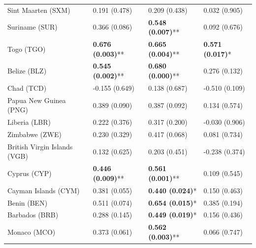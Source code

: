 \begin{longtable}{p{5cm}p{3cm}p{3cm}p{5cm}}
Sint Maarten (SXM) & \textcolor{atlOrange600}{0.191 (0.478)} & \textcolor{atlOrange600}{0.209 (0.438)} & \textcolor{atlOrange600}{0.032 (0.905)} \\
Suriname (SUR) & \textcolor{atlOrange600}{0.366 (0.086)} & \textcolor{atlLime600}{\textbf{0.548 (0.007)}**} & \textcolor{atlOrange600}{0.092 (0.676)} \\
Togo (TGO) & \textcolor{atlLime600}{\textbf{0.676 (0.003)}**} & \textcolor{atlLime600}{\textbf{0.665 (0.004)}**} & \textcolor{atlLime600}{\textbf{0.571 (0.017)}*} \\
Belize (BLZ) & \textcolor{atlLime600}{\textbf{0.545 (0.002)}**} & \textcolor{atlLime600}{\textbf{0.680 (0.000)}**} & \textcolor{atlOrange600}{0.276 (0.132)} \\
Chad (TCD) & \textcolor{atlOrange600}{-0.155 (0.649)} & \textcolor{atlOrange600}{0.138 (0.687)} & \textcolor{atlOrange600}{-0.510 (0.109)} \\
Papua New Guinea (PNG) & \textcolor{atlOrange600}{0.389 (0.090)} & \textcolor{atlOrange600}{0.387 (0.092)} & \textcolor{atlOrange600}{0.134 (0.574)} \\
Liberia (LBR) & \textcolor{atlOrange600}{0.222 (0.376)} & \textcolor{atlOrange600}{0.317 (0.200)} & \textcolor{atlOrange600}{-0.030 (0.906)} \\
Zimbabwe (ZWE) & \textcolor{atlOrange600}{0.230 (0.329)} & \textcolor{atlOrange600}{0.417 (0.068)} & \textcolor{atlOrange600}{0.081 (0.734)} \\
British Virgin Islands (VGB) & \textcolor{atlOrange600}{0.132 (0.625)} & \textcolor{atlOrange600}{0.203 (0.451)} & \textcolor{atlOrange600}{-0.238 (0.374)} \\
Cyprus (CYP) & \textcolor{atlLime600}{\textbf{0.446 (0.009)}**} & \textcolor{atlLime600}{\textbf{0.561 (0.001)}**} & \textcolor{atlOrange600}{0.109 (0.545)} \\
Cayman Islands (CYM) & \textcolor{atlOrange600}{0.381 (0.055)} & \textcolor{atlLime600}{\textbf{0.440 (0.024)}*} & \textcolor{atlOrange600}{0.150 (0.463)} \\
Benin (BEN) & \textcolor{atlOrange600}{0.511 (0.074)} & \textcolor{atlLime600}{\textbf{0.654 (0.015)}*} & \textcolor{atlOrange600}{0.385 (0.194)} \\
Barbados (BRB) & \textcolor{atlOrange600}{0.288 (0.145)} & \textcolor{atlLime600}{\textbf{0.449 (0.019)}*} & \textcolor{atlOrange600}{0.156 (0.436)} \\
Monaco (MCO) & \textcolor{atlOrange600}{0.373 (0.061)} & \textcolor{atlLime600}{\textbf{0.562 (0.003)}**} & \textcolor{atlOrange600}{0.066 (0.747)} \\

\end{longtable}
